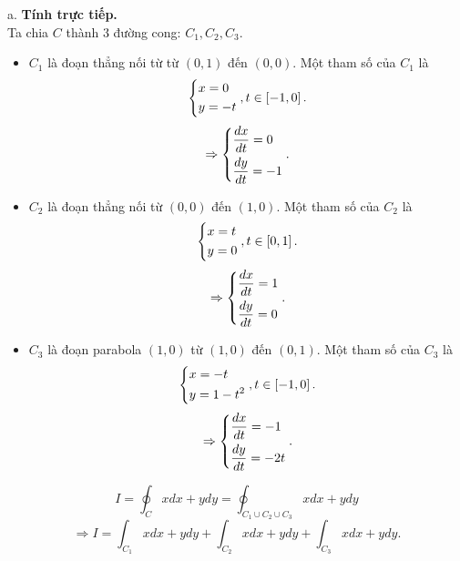\documentclass[12pt,a4paper]{article}
\begin{document}
a. \textbf{Tính trực tiếp.}\\
Ta chia \(C\) thành \(3\) đường cong: \(C_1, C_2, C_3.\)
\begin{itemize}
	\item \(C_1\) là đoạn thẳng nối từ từ \(\left( {0,1} \right)\) đến \(\left( {0,0} \right).\) Một tham số của \(C_1\) là
	\[\left\{ \begin{gathered}
  x = 0 \hfill \\
  y =  - t \hfill \\ 
\end{gathered}  \right.,t \in \left[ { - 1,0} \right].\]
\[ \Rightarrow \left\{ \begin{gathered}
  \frac{{dx}}{{dt}} = 0 \hfill \\
  \frac{{dy}}{{dt}} =  - 1 \hfill \\ 
\end{gathered}  \right..\]
\item \(C_2\) là đoạn thẳng nối từ \(\left( {0,0} \right)\) đến \(\left( {1,0} \right).\) Một tham số của \(C_2\) là 
\[\left\{ \begin{gathered}
  x = t \hfill \\
  y = 0 \hfill \\ 
\end{gathered}  \right.,t \in \left[ {0,1} \right].\]
\[ \Rightarrow \left\{ \begin{gathered}
  \frac{{dx}}{{dt}} = 1 \hfill \\
  \frac{{dy}}{{dt}} = 0 \hfill \\ 
\end{gathered}  \right..\]
\item \(C_3\) là đoạn parabola \(\left( {1,0} \right)\) từ \(\left( {1,0} \right)\) đến \(\left( {0,1} \right).\) Một tham số của \(C_3\) là
\[\left\{ \begin{gathered}
  x =  - t \hfill \\
  y = 1 - {t^2} \hfill \\ 
\end{gathered}  \right.,t \in \left[ { - 1,0} \right].\]
\[ \Rightarrow \left\{ \begin{gathered}
  \frac{{dx}}{{dt}} =  - 1 \hfill \\
  \frac{{dy}}{{dt}} =  - 2t \hfill \\ 
\end{gathered}  \right..\]
\end{itemize}
\[I = \oint_C x dx + ydy = \oint_{{C_1} \cup {C_2} \cup {C_3}} x dx + ydy\]
\[ \Rightarrow I = \int_{{C_1}} {xdx + ydy}  + \int_{{C_2}} {xdx + ydy}  + \int_{{C_3}} {xdx + ydy} .\]
\end{document}
